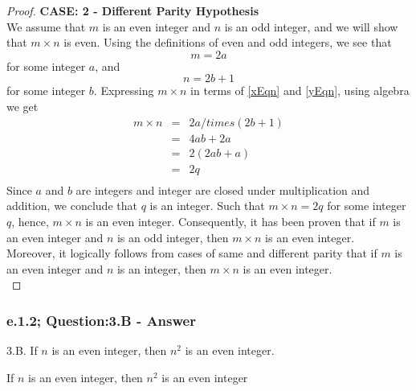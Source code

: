 \begin{proof}
{\bf CASE: 2 - Different Parity Hypothesis} \\
We assume that $m$ is an even integer and $n$ is an odd integer, and we will show that $m  \times n$ is even. Using the definitions of even and odd integers, we see that
\begin{equation}
\label{xEqn}
m = 2a
\end{equation}
for some integer $a$, and
\begin{equation}
\label{yEqn}
n = 2b + 1
\end{equation}
for some integer $b$. Expressing $m \times n$ in terms of \ref{xEqn} and \ref{yEqn}, using algebra we get
\begin{eqnarray*}
m \times n & = & 2a /times (2b + 1)  \nonumber \\
& = & 4ab + 2a \nonumber \\
& = & 2(2ab + a) \nonumber \\
& = & 2q \nonumber \\
\end{eqnarray*}
Since $a$ and $b$ are integers and integer are closed under multiplication and addition, we conclude that $q$ is an integer. Such that $m \times n = 2q$ for some integer $q$, hence, $m \times n$ is an even integer. Consequently, it has been proven that if $m$ is an even integer and $n$  is an odd integer, then $m \times n$ is an even integer. \\

Moreover, it logically follows from cases of same and different parity that if $m$ is an even integer and $n$ is an integer, then $m \times n$ is an even integer. \\
\end{proof}


\subsubsection*{e.1.2; Question:3.B - Answer}
3.B. If $n$ is an even integer, then $n^2$ is an even integer. \\

\begin{tcolorbox}
\begin{theorem}
If $n$ is an even integer, then $n^2$ is an even integer
\end{theorem}
\end{tcolorbox}

